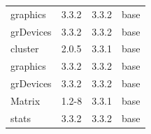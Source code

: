 \begin{longtable}{llll}
\rowcolor{black!10}
graphics     & 3.3.2          & 3.3.2 & base            \\
\rowcolor{black!5}
grDevices    & 3.3.2          & 3.3.2 & base            \\
\rowcolor{black!10}
cluster      & 2.0.5          & 3.3.1 & base            \\
\rowcolor{black!5}
graphics     & 3.3.2          & 3.3.2 & base            \\
\rowcolor{black!10}
grDevices    & 3.3.2          & 3.3.2 & base            \\
\rowcolor{black!5}
Matrix       & 1.2-8          & 3.3.1 & base            \\
\rowcolor{black!10}
stats        & 3.3.2          & 3.3.2 & base            \\
\hline
\end{longtable}

